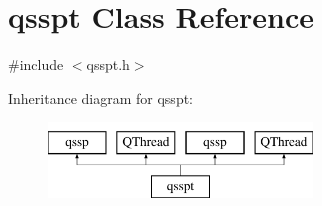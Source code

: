 \hypertarget{classqsspt}{\section{qsspt Class Reference}
\label{classqsspt}
}


{\ttfamily \#include $<$qsspt.\-h$>$}

Inheritance diagram for qsspt\-:\begin{figure}[H]
\begin{center}
\leavevmode
\includegraphics[height=2.000000cm]{classqsspt}
\end{center}
\end{figure}
